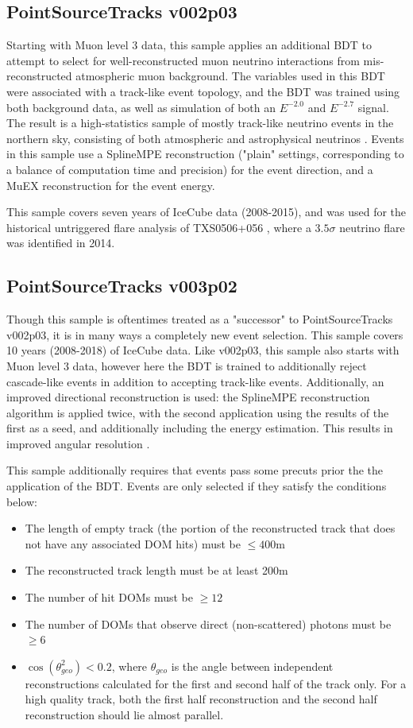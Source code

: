 \subsection{PointSourceTracks v002p03}
Starting with Muon level 3 data, this sample applies an additional BDT to attempt to select for well-reconstructed muon neutrino interactions from mis-reconstructed atmospheric muon background. The variables used in this BDT were associated with a track-like event topology, and the BDT was trained using both background data, as well as simulation of both an $E^{-2.0}$ and $E^{-2.7}$ signal. The result is a high-statistics sample of mostly track-like neutrino events in the northern sky, consisting of both atmospheric and astrophysical neutrinos \cite{7yr_tint}. Events in this sample use a SplineMPE reconstruction ("plain" settings, corresponding to a balance of computation time and precision) for the event direction, and a MuEX reconstruction for the event energy.


This sample covers seven years of IceCube data (2008-2015), and was used for the historical untriggered flare analysis of TXS0506+056 \cite{TXS_Archival}, where a $3.5\sigma$ neutrino flare was identified in 2014. 

\subsection{PointSourceTracks v003p02}
Though this sample is oftentimes treated as a "successor" to PointSourceTracks v002p03, it is in many ways a completely new event selection. This sample covers 10 years (2008-2018) of IceCube data. Like v002p03, this sample also starts with Muon level 3 data, however here the BDT is trained to additionally reject cascade-like events in addition to accepting track-like events. Additionally, an improved directional reconstruction is used: the SplineMPE reconstruction algorithm is applied twice, with the second application using the results of the first as a seed, and additionally including the energy estimation. This results in improved angular resolution \cite{TessaThesis}.

This sample additionally requires that events pass some precuts prior the the application of the BDT. Events are only selected if they satisfy the conditions below:

\begin{itemize}
    \item The length of empty track (the portion of the reconstructed track that does not have any associated DOM hits) must be $\leq 400$m
    \item The reconstructed track length must be at least 200m
    \item The number of hit DOMs must be $\geq 12$
    \item The number of DOMs that observe direct (non-scattered) photons must be $\geq 6$
    \item $\cos(\theta_{geo}^2) < 0.2$, where $\theta_{geo}$ is the angle between independent reconstructions calculated for the first and second half of the track only. For a high quality track, both the first half reconstruction and the second half reconstruction should lie almost parallel. 
\end{itemize}

